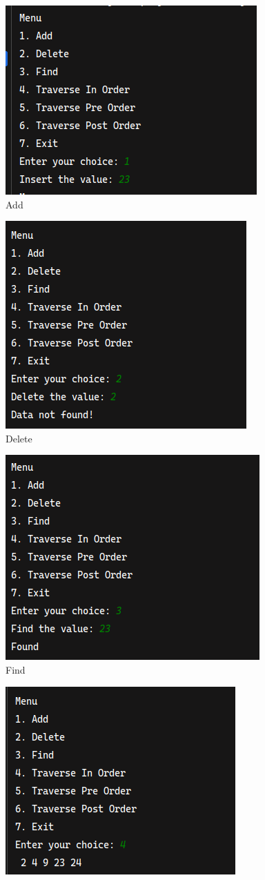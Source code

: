 \documentclass[12pt,titlepage]{article}
\begin{document}
\begin{enumerate}
{        \pagebreak

        \begin{figure}[h]
            \centering
            \includegraphics[width=.5\textwidth]{./images/a.png}
            \caption{Add}
        \end{figure}
        \begin{figure}[h]
            \centering
            \includegraphics[width=.5\textwidth]{./images/b.png}
            \caption{Delete}
        \end{figure}
        \pagebreak
        \begin{figure}[h]
            \centering
            \includegraphics[width=.5\textwidth]{./images/c.png}
            \caption{Find}
        \end{figure}
        \begin{figure}[h]
            \centering
            \includegraphics[width=.5\textwidth]{./images/d.png}

\end{figure}}
\end{enumerate}
\end{document}

